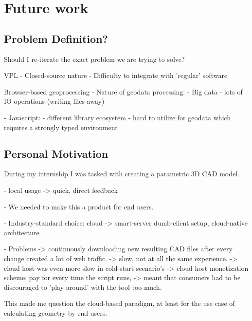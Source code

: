 \chapter{Future work}
\label{chap:postscript}



\section{Problem Definition?}

Should I re-iterate the exact problem we are trying to solve? 

VPL
- Closed-source nature 
- Difficulty to integrate with 'regular' software

Browser-based geoprocessing
- Nature of geodata processing: 
  - Big data 
  - lots of IO operations (writing files away)

- Javascript:
  - different library ecosystem 
  - hard to utilize for geodata which requires a strongly typed environment 



\section{Personal Motivation}
During my internship I was tasked with creating a parametric 3D CAD model. 


- local usage 
  -> quick, direct feedback

- We needed to make this a product for end users. 

- Industry-standard choice: cloud 
  -> smart-server dumb-client setup, cloud-native architecture 

- Problems
  -> continuously downloading new resulting CAD files after every change created a lot of web traffic. 
  -> slow, not at all the same experience.
  -> cloud host was even more slow in cold-start scenario's   
  -> cloud host monetization scheme: pay for every time the script runs, 
     -> meant that consumers had to be discouraged to 'play around' with the tool too much. 
  
This made me question the cloud-based paradigm, at least for the use case of calculating geometry by end users. 

